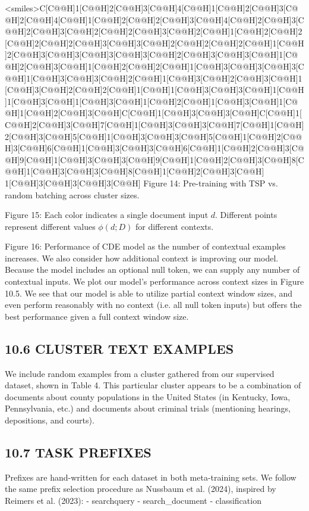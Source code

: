 <smiles>C[C@@H]1[C@@H]2[C@@H]3[C@@H]4[C@@H]1[C@@H]2[C@@H]3[C@@H]2[C@@H]4[C@@H]1[C@@H]2[C@@H]2[C@@H]3[C@@H]4[C@@H]2[C@@H]3[C@@H]2[C@@H]3[C@@H]2[C@@H]2[C@@H]3[C@@H]2[C@@H]1[C@@H]2[C@@H]2[C@@H]2[C@@H]2[C@@H]3[C@@H]3[C@@H]2[C@@H]2[C@@H]2[C@@H]1[C@@H]2[C@@H]3[C@@H]3[C@@H]3[C@@H]3[C@@H]2[C@@H]3[C@@H]3[C@@H]1[C@@H]2[C@@H]3[C@@H]1[C@@H]2[C@@H]2[C@@H]1[C@@H]3[C@@H]3[C@@H]3[C@@H]1[C@@H]3[C@@H]3[C@@H]2[C@@H]1[C@@H]3[C@@H]2[C@@H]3[C@@H]1[C@@H]3[C@@H]2[C@@H]2[C@@H]1[C@@H]1[C@@H]3[C@@H]3[C@@H]1[C@@H]1[C@@H]3[C@@H]1[C@@H]3[C@@H]1[C@@H]2[C@@H]1[C@@H]3[C@@H]1[C@@H]1[C@@H]2[C@@H]3[C@@H]C[C@@H]1[C@@H]3[C@@H]3[C@@H]C[C@@H]1[C@@H]2[C@@H]3[C@@H]7[C@@H]1[C@@H]3[C@@H]3[C@@H]7[C@@H]1[C@@H]2[C@@H]3[C@@H]5[C@@H]1[C@@H]3[C@@H]3[C@@H]5[C@@H]1[C@@H]2[C@@H]3[C@@H]6[C@@H]1[C@@H]3[C@@H]3[C@@H]6[C@@H]1[C@@H]2[C@@H]3[C@@H]9[C@@H]1[C@@H]3[C@@H]3[C@@H]9[C@@H]1[C@@H]2[C@@H]3[C@@H]8[C@@H]1[C@@H]3[C@@H]3[C@@H]8[C@@H]1[C@@H]2[C@@H]3[C@@H] 1[C@@H]3[C@@H]3[C@@H]3[C@@H]
Figure 14: Pre-training with TSP vs. random batching across cluster sizes.

Figure 15: Each color indicates a single document input \(d\). Different points represent different values \(\phi(d ; D)\) for different contexts.

Figure 16: Performance of CDE model as the number of contextual examples increases.
We also consider how additional context is improving our model. Because the model includes an optional null token, we can supply any number of contextual inputs. We plot our model's performance across context sizes in Figure 10.5. We see that our model is able to utilize partial context window sizes, and even perform reasonably with no context (i.e. all null token inputs) but offers the best performance given a full context window size.
\subsection*{10.6 CLUSTER TEXT EXAMPLES}
We include random examples from a cluster gathered from our supervised dataset, shown in Table 4. This particular cluster appears to be a combination of documents about county populations in the United States (in Kentucky, Iowa, Pennsylvania, etc.) and documents about criminal trials (mentioning hearings, depositions, and courts).
\subsection*{10.7 TASK PREFIXES}
Prefixes are hand-written for each dataset in both meta-training sets. We follow the same prefix selection procedure as Nussbaum et al. (2024), inspired by Reimers et al. (2023):
- searchquery
- search_document
- classification

